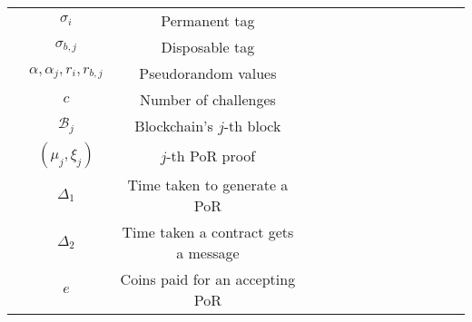 \begin{table*}[!htbp]
\begin{scriptsize}
\begin{center}
{{\begin{tabular}{|c|c|c|c|c|c|c|c|c|c|c|c|c|c|}
&\cellcolor{white!20}\scriptsize$\sigma_{\scriptscriptstyle i}$&\cellcolor{white!20}\scriptsize Permanent tag   \\  
 &\cellcolor{gray!20}\scriptsize$\sigma_{\scriptscriptstyle b,j}$&\cellcolor{gray!20}\scriptsize Disposable tag   \\    
 
    &\cellcolor{white!20}\scriptsize$\alpha, \alpha_{\scriptscriptstyle j}, r_{\scriptscriptstyle i},r_{\scriptscriptstyle b,j}$&\cellcolor{white!20}\scriptsize Pseudorandom values  \\ 
                
&\cellcolor{gray!20}\scriptsize$c$&\cellcolor{gray!20}\scriptsize Number of challenges \\ 
        
&\cellcolor{white!20}\scriptsize$\mathcal {B}_{\scriptscriptstyle j}$&\cellcolor{white!20}\scriptsize Blockchain's $j{\text{-th}}$ block\\ 

&\cellcolor{gray!20}\scriptsize$(\mu_{\scriptscriptstyle j},\xi_{\scriptscriptstyle j})$&\cellcolor{gray!20}\scriptsize $j{\text{-th}}$ PoR proof\\ 
&\cellcolor{white!20}\scriptsize$\Delta_{\scriptscriptstyle 1}$&\cellcolor{white!20}\scriptsize Time taken to generate  a PoR\\ 

&\cellcolor{gray!20}\scriptsize$\Delta_{\scriptscriptstyle 2}$&\cellcolor{gray!20}\cellcolor{gray!20}\scriptsize Time taken a contract gets a message\\ 

&\cellcolor{white!20}\scriptsize$e$&\cellcolor{white!20}\scriptsize Coins paid for an accepting PoR\\ 

\hline
   

           
           
           
\end{tabular}\label{table:notation-table}

}}
\end{center}
\end{scriptsize}
\end{table*}





























